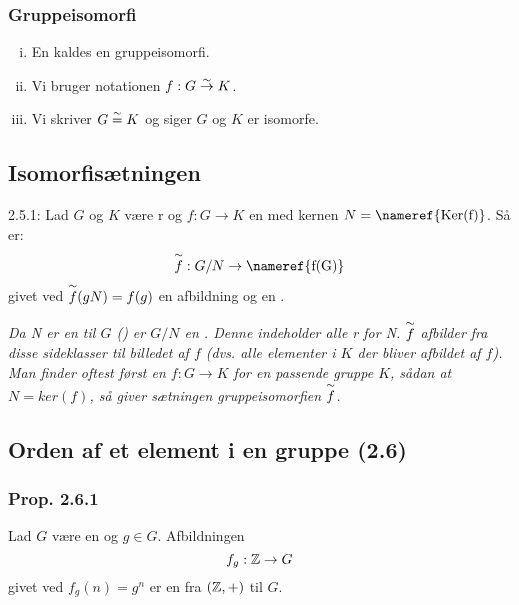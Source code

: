 \subsubsection{Gruppeisomorfi}
\label{Gruppeisomorfi}
\begin{enumerate}[(i)]
    \item En   kaldes en
    gruppeisomorfi.
    \item Vi bruger notationen $f: G \overset{\sim}{\rightarrow} K$.
    \item Vi skriver $G \overset{\sim}{=} K$ og siger $G$ og $K$ er isomorfe.
\end{enumerate}

\subsection{Isomorfisætningen}
\label{isomorfitheorem}
2.5.1: Lad $G$ og $K$ være r og $f: G \rightarrow K$ en
 med kernen $N = \text{\nameref{Ker(f)}}$. Så er:
\begin{equation*}
  \myisom{f}: G/N \rightarrow \text{\nameref{f(G)}}
\end{equation*}
givet ved $\overset{\sim}{f}(gN) = f(g)$ en  afbildning og en
.

\textit{Da N er en  til $G$ ()
er $G/N$ en . Denne indeholder alle
r for N. $\overset{\sim}{f}$ afbilder fra disse sideklasser til
billedet af $f$ (dvs. alle elementer i $K$ der bliver afbildet af $f$). Man
finder oftest først en   $f: G
\rightarrow K$ for en passende gruppe $K$, sådan at $N = ker(f)$, så giver
sætningen gruppeisomorfien $\overset{\sim}{f}$.}

\subsection{Orden af et element i en gruppe (2.6)}
\subsubsection{Prop. 2.6.1}
\label{2.6.1}
Lad $G$ være en  og $g \in G$. Afbildningen
\begin{equation*}
  f_g: \mathbb{Z} \rightarrow G
\end{equation*}
givet ved $f_g(n) = g^n$ er en  fra $(\mathbb{Z}, +)$ til $G$.

